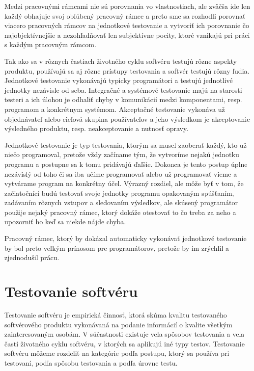 \documentclass[11pt,twoside,slovak,a4paper]{article}
\begin{document}
	Medzi pracovnými rámcami nie sú porovnania vo vlastnostiach, ale zväčša ide len každý obhajuje svoj obľúbený pracovný rámec a preto sme sa rozhodli porovnať viacero pracovných rámcov na jednotkové testovanie a vytvoriť ich porovnanie čo najobjektívnejšie a nezohľadňovať len subjektívne pocity, ktoré vznikajú pri práci s každým pracovným rámcom.
		
	Tak ako sa v rôznych častiach životného cyklu softvéru testujú rôzne aspekty produktu, používajú sa aj rôzne prístupy testovania a softvér testujú rôzny ľudia. Jednotkové testovanie vykonávajú typicky programátori a testujú jednotlivé jednotky nezávisle od seba. Integračné a systémové testovanie majú na starosti testeri a ich úlohou je odhaliť chyby v komunikácií medzi komponentami, resp. programom a konkrétnym systémom. Akceptačné testovanie vykonáva už objednávateľ alebo cieľová skupina používateľov a jeho výsledkom je akceptovanie výsledného produktu, resp. neakceptovanie a nutnosť opravy\cite{Myers}.
	
	Jednotkové testovanie je typ testovania, ktorým sa musel zaoberať každý, kto už niečo programoval, pretože vždy začíname tým, že vytvoríme nejakú jednotku programu a postupne sa k tomu pridávajú ďaľšie. Dokonca je tento postup úplne nezávislý od toho či sa iba učíme programovať alebo už programovať vieme a vytvárame program na konkrétny účel. Výrazný rozdiel, ale môže byť v tom, že začiatočníci budú testovať svoje jednotky programu opakovaným spúšťaním, zadávaním rôznych vstupov a sledovaním výsledkov, ale skúsený programátor použije nejaký pracovný rámec, ktorý dokáže otestovať to čo treba za neho a upozorniť ho keď sa niekde nájde chyba.
	
	Pracovný rámec, ktorý by dokázal automaticky vykonávať jednotkové testovanie by bol preto veľkým prínosom pre programátorov, pretože by im zrýchlil a zjednodušil prácu. 
	
	
	\newpage
	\section{Testovanie softvéru}
	Testovanie softvéru je empirická činnosť, ktorá skúma kvalitu testovaného softvérového produktu vykonávaná na podanie informácií o kvalite všetkým zainteresovaným osobám\cite{Kaner2006}. V súčastnosti existuje veľa spôsobov testovania a veľa častí životného cyklu softvéru, v ktorých sa aplikujú iné typy testov. Testovanie softvéru môžeme rozdeliť na kategórie podľa postupu, ktorý sa používa pri testovaní, podľa spôsobu testovania a podľa úrovne testu.
	
\end{document}
